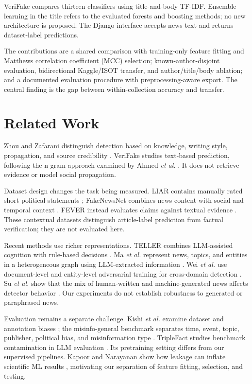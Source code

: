 \documentclass[conference]{IEEEtran}
\begin{document}
VeriFake compares thirteen classifiers using title-and-body TF-IDF. Ensemble learning in the title refers to the evaluated forests and boosting methods; no new architecture is proposed. The Django interface accepts news text and returns dataset-label predictions.

The contributions are a shared comparison with training-only feature fitting and Matthews correlation coefficient (MCC) selection; known-author-disjoint evaluation, bidirectional Kaggle/ISOT transfer, and author/title/body ablation; and a documented evaluation procedure with preprocessing-aware export. The central finding is the gap between within-collection accuracy and transfer.

\section{Related Work}
Zhou and Zafarani distinguish detection based on knowledge, writing style, propagation, and source credibility \cite{zhou}. VeriFake studies text-based prediction, following the n-gram approach examined by Ahmed \emph{et al.} \cite{ahmed}. It does not retrieve evidence or model social propagation.

Dataset design changes the task being measured. LIAR contains manually rated short political statements \cite{liar}; FakeNewsNet combines news content with social and temporal context \cite{fakenewsnet}. FEVER instead evaluates claims against textual evidence \cite{fever}. These contextual datasets distinguish article-label prediction from factual verification; they are not evaluated here.

Recent methods use richer representations. TELLER combines LLM-assisted cognition with rule-based decisions \cite{teller}. Ma \emph{et al.} represent news, topics, and entities in a heterogeneous graph using LLM-extracted information \cite{ma}. Wei \emph{et al.} use document-level and entity-level adversarial training for cross-domain detection \cite{wei}. Su \emph{et al.} show that the mix of human-written and machine-generated news affects detector behavior \cite{su}. Our experiments do not establish robustness to generated or paraphrased news.

Evaluation remains a separate challenge. Kishi \emph{et al.} examine dataset and annotation biases \cite{kishi}; the misinfo-general benchmark separates time, event, topic, publisher, political bias, and misinformation type \cite{verhoeven}. TripleFact studies benchmark contamination in LLM evaluation \cite{triplefact}. Its pretraining setting differs from our supervised pipelines. Kapoor and Narayanan show how leakage can inflate scientific ML results \cite{kapoor}, motivating our separation of feature fitting, selection, and testing.
\end{document}
